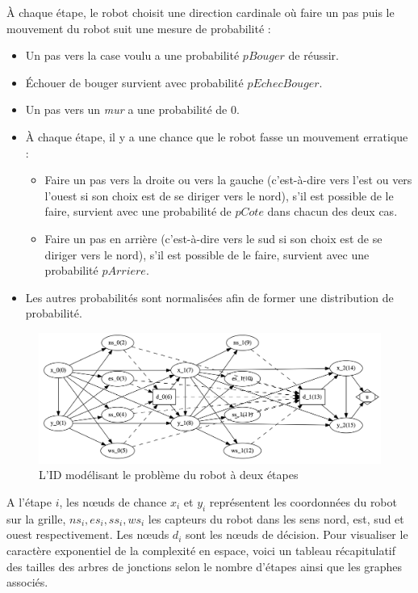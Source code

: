 \documentclass[12pt]{article}
\begin{document}
À chaque étape, le robot choisit une direction cardinale où faire un pas puis le mouvement du robot suit une mesure de probabilité :
\begin{itemize}
  \item Un pas vers la case voulu a une probabilité $pBouger$ de réussir.
  \item Échouer de bouger survient avec probabilité $pEchecBouger$.
  \item Un pas vers un \textit{mur} a une probabilité de 0.
  \item À chaque étape, il y a une chance que le robot fasse un mouvement erratique :
  \begin{itemize}
        \item Faire un pas vers la droite ou vers la gauche (c'est-à-dire vers l'est ou vers l'ouest si son choix est de se diriger vers le nord), s'il est possible de le faire, survient avec une probabilité de $pCote$ dans chacun des deux cas.
        \item Faire un pas en arrière (c'est-à-dire vers le sud si son choix est de se diriger vers le nord), s'il est possible de le faire, survient avec une probabilité $pArriere$.
        \end{itemize}
  \item Les autres probabilités sont normalisées afin de former une distribution de probabilité.
\end{itemize}

\begin{figure}[ht]
\centering
\includegraphics[scale=0.22]{docs/ressources_rapport/IDROBOT.png}
\caption{L'ID modélisant le problème du robot à deux étapes }
\end{figure}

A l'étape $i$, les nœuds de chance $x_i$ et $y_i$ représentent les coordonnées du robot sur la grille, $ns_i, es_i, ss_i, ws_i$ les capteurs du robot dans les sens nord, est, sud et ouest respectivement. Les nœuds $d_i$ sont les nœuds de décision.
Pour visualiser le caractère exponentiel de la complexité en espace, voici un tableau récapitulatif des tailles des arbres de jonctions selon le nombre d'étapes ainsi que les graphes associés.
\end{document}
